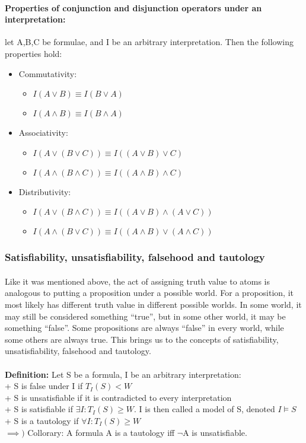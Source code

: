 \documentclass[part1.tex]{subfiles}
\begin{document}
\paragraph{Properties of conjunction and disjunction operators
under an interpretation:} let A,B,C be formulae, and I be an
arbitrary interpretation. Then the following properties hold:
\begin{itemize}
\item Commutativity:
  \begin{itemize}
    \item $I(A \vee B) \equiv I(B \vee A)$
    \item $I(A \wedge B) \equiv I(B \wedge A)$
  \end{itemize}
\item Associativity:
  \begin{itemize}
    \item $I(A \vee (B \vee C)) \equiv I((A \vee B) \vee C)$
    \item $I(A \wedge (B \wedge C)) \equiv I((A \wedge B) \wedge C)$
  \end{itemize}
\item Distributivity:
  \begin{itemize}
    \item $I(A \vee (B \wedge C)) \equiv I((A \vee B) \wedge (A \vee
      C))$
    \item $I(A \wedge (B \vee C)) \equiv I((A \wedge B) \vee (A \wedge
      C))$
  \end{itemize}
\end{itemize}
\subsubsection{Satisfiability, unsatisfiability, falsehood and
tautology}
\paragraph{} Like it was mentioned above, the act of assigning
truth value to atoms is analogous to putting a proposition under
a possible world. For a proposition, it most likely has different truth
value in different possible worlds. In some world, it may still
be considered something ``true'', but in some other world, it
may be something ``false''. Some propositions are always
``false'' in every world, while some others are always true.
This brings us to the concepts of
satisfiability, unsatisfiability, falsehood and tautology.\\\\
{\bfseries Definition:} Let S be a formula, I be an arbitrary interpretation:\\
\indent + S is false under I if \(T_I(S) < W\)\\
\indent + S is unsatisfiable if it is contradicted to every interpretation\\ 
\indent + S is satisfiable if \(\exists I: T_I(S) \ge W\). I is then called a model of S, denoted \(I \models S\)\\
\indent + S is a tautology if \(\forall I: T_I(S) \ge W\)\\
\indent \(\implies)\) Collorary: A formula A is a tautology iff \(\neg\)A is unsatisfiable.
\end{document}
